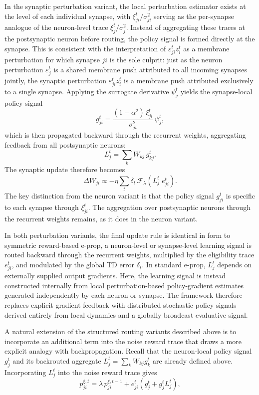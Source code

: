    In the synaptic perturbation variant, the local perturbation estimator exists
    at the level of each individual synapse, with $\xi_{ji}^t / \sigma_{ji}^2$
    serving as the per-synapse analogue of the neuron-level trace $\xi_j^t /
    \sigma_j^2$.
    Instead of aggregating these traces at the postsynaptic neuron before routing,
    the policy signal is formed directly at the synapse.
    This is consistent with the interpretation of $\varepsilon_{ji}^t z_i^t$ as a
    membrane perturbation for which synapse $ji$ is the sole culprit: just as the
    neuron perturbation $\varepsilon_j^t$ is a shared membrane push attributed to
    all incoming synapses jointly, the synaptic perturbation $\varepsilon_{ji}^t
    z_i^t$ is a membrane push attributed exclusively to a single synapse. Applying the surrogate derivative $\psi_j^t$ yields the synapse-local policy
    signal
    \[
        g_{ji}^t
        =
        \frac{(1-\alpha^2)\,\xi_{ji}^t}{\sigma_{ji}^2}\,
        \psi_j^t,
    \]
    which is then propagated backward through the recurrent weights, aggregating
    feedback from all postsynaptic neurons:
    \[
        L_{j}^t
        =
        \sum_{k}
        W_{kj}\,
        g_{kj}^t.
    \]
    The synaptic update therefore becomes
    \[
        \Delta W_{ji}
        \propto
        -\eta
        \sum_t
        \delta_t\,
        \mathcal{F}_{\lambda}
        \!\left(
            L_{j}^t\;
            e_{ji}^t
        \right).
    \]
    The key distinction from the neuron variant is that the policy signal $g_{ji}^t$
    is specific to each synapse through $\xi_{ji}^t$. The aggregation over postsynaptic neurons
    through the recurrent weights remains, as it does in the neuron variant.
    
    In both perturbation variants, the final update rule is identical in form to
    symmetric reward-based e-prop, a neuron-level or synapse-level learning signal
    is routed backward through the recurrent weights, multiplied by the eligibility
    trace $e_{ji}^t$, and modulated by the global TD error $\delta_t$.
    In standard e-prop, $L_j^t$ depends on externally supplied output gradients.
    Here, the learning signal is instead constructed internally from local
    perturbation-based policy-gradient estimates generated independently by each
    neuron or synapse.
    The framework therefore replaces explicit gradient feedback with distributed
    stochastic policy signals derived entirely from local dynamics and a globally
    broadcast evaluative signal.

    A natural extension of the structured routing variants described above is to incorporate
    an additional term into the noise reward trace that draws a more explicit analogy with
    backpropagation. Recall that the neuron-local policy signal $g_j^t$ and its backrouted
    aggregate $L_j^t = \sum_k W_{kj} g_k^t$ are already defined above. Incorporating $L_j^t$
    into the noise reward trace gives
    \begin{equation}
        p_{ji}^{\xi, t} = \lambda \, p_{ji}^{\xi, t-1}
        + e_{ji}^t \left(g_j^t + g_j^tL_j^t \right),
        \label{eq:rl_noise_trace_extended}
    \end{equation}
    
